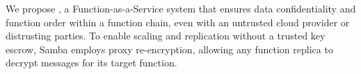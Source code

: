 %
We propose \SystemName, a Function-as-a-Service system that ensures data
confidentiality and function order within a function chain, even with an
untrusted cloud provider or distrusting parties.
%
%
To enable scaling and replication without a trusted key escrow, Samba employs
proxy re-encryption, allowing any function replica to decrypt messages for its
target function.



